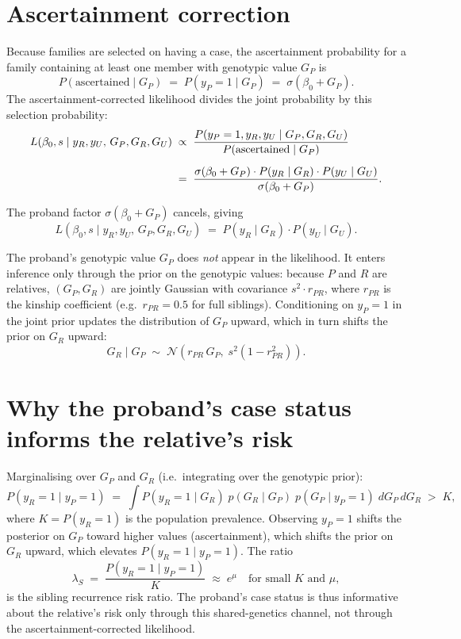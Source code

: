 \documentclass[12pt]{article}
\begin{document}
\section*{Ascertainment correction}

Because families are selected on having a case, the ascertainment probability
for a family containing at least one member with genotypic value $G_P$ is
\[
  P(\text{ascertained} \mid G_P) \;=\; P(y_P = 1 \mid G_P)
  \;=\; \sigma(\beta_0 + G_P).
\]
The ascertainment-corrected likelihood divides the joint probability by this
selection probability:
\begin{align}
  L(\beta_0, s \mid y_R, y_U,\, G_P, G_R, G_U)
  &\;\propto\;
  \frac{P(y_P=1, y_R, y_U \mid G_P, G_R, G_U)}
       {P(\text{ascertained} \mid G_P)}
  \notag\\[6pt]
  &\;=\;
  \frac{\sigma(\beta_0+G_P)\cdot P(y_R \mid G_R)\cdot P(y_U \mid G_U)}
       {\sigma(\beta_0+G_P)}.
\end{align}

The proband factor $\sigma(\beta_0+G_P)$ cancels, giving
\begin{equation}
  \boxed{
    L(\beta_0, s \mid y_R, y_U,\, G_P, G_R, G_U)
    \;=\;
    P(y_R \mid G_R)\cdot P(y_U \mid G_U).
  }
\end{equation}

The proband's genotypic value $G_P$ does \emph{not} appear in the likelihood.
It enters inference only through the prior on the genotypic values: because $P$
and $R$ are relatives, $(G_P, G_R)$ are jointly Gaussian with covariance
$s^2 \cdot r_{PR}$, where $r_{PR}$ is the kinship coefficient (e.g.\
$r_{PR}=0.5$ for full siblings).  Conditioning on $y_P = 1$ in the joint
prior updates the distribution of $G_P$ upward, which in turn shifts the prior
on $G_R$ upward:
\[
  G_R \mid G_P \;\sim\; \mathcal{N}\!\left(r_{PR}\,G_P,\;
  s^2(1 - r_{PR}^2)\right).
\]

\section*{Why the proband's case status informs the relative's risk}

Marginalising over $G_P$ and $G_R$ (i.e.\ integrating over the genotypic
prior):
\[
  P(y_R = 1 \mid y_P = 1)
  \;=\;
  \int P(y_R=1 \mid G_R)\;
  p(G_R \mid G_P)\;
  p(G_P \mid y_P=1)\;
  dG_P\, dG_R
  \;>\; K,
\]
where $K = P(y_R=1)$ is the population prevalence.  Observing $y_P=1$
shifts the posterior on $G_P$ toward higher values (ascertainment), which
shifts the prior on $G_R$ upward, which elevates $P(y_R=1 \mid y_P=1)$.
The ratio
\[
  \lambda_S \;=\; \frac{P(y_R=1 \mid y_P=1)}{K}
  \;\approx\; e^{\mu} \quad \text{for small } K \text{ and } \mu,
\]
is the sibling recurrence risk ratio.  The proband's case status is thus
informative about the relative's risk only through this shared-genetics
channel, not through the ascertainment-corrected likelihood.
\end{document}
